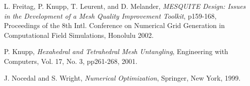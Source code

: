 \begin{thebibliography}{999}
L. Freitag, P. Knupp, T. Leurent, and D. Melander, {\it MESQUITE Design: Issues in the Development of a Mesh Quality Improvement Toolkit}, p159-168, Proceedings of the 8th Intl. Conference on Numerical Grid Generation in Computational Field Simulations, Honolulu 2002.

P. Knupp, {\it Hexahedral and Tetrahedral Mesh Untangling}, Engineering with Computers, Vol. 17, No. 3, pp261-268, 2001.

J. Nocedal and S. Wright, {\it Numerical Optimization}, Springer, New York, 1999.

\end{thebibliography}

\newpage
{} \newline
\label{append_A}
\newpage
{} \newline
\label{append_B}
\newpage
{} \newline
\label{append_C}



